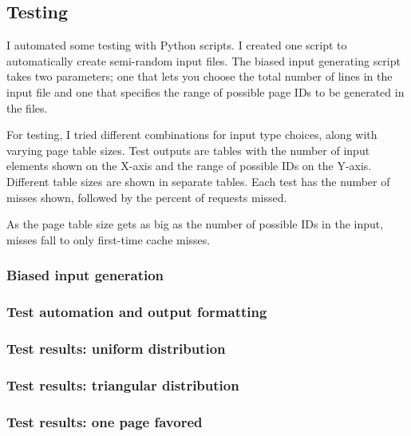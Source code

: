 \documentclass[paper=a4, fontsize=11pt]{scrartcl} %
\numberwithin{equation}{section} %
\numberwithin{figure}{section} %
\numberwithin{table}{section} %
\begin{document}

\subsection{Testing}
I automated some testing with Python scripts. I created one script to automatically create semi-random input files. The biased input generating script takes two parameters; one that lets you choose the total number of lines in the input file and one that specifies the range of possible page IDs to be generated in the files.

For testing, I tried different combinations for input type choices, along with varying page table sizes. Test outputs are tables with the number of input elements shown on the X-axis and the range of possible IDs on the Y-axis. Different table sizes are shown in separate tables. Each test has the number of misses shown, followed by the percent of requests missed.

As the page table size gets as big as the number of possible IDs in the input, misses fall to only first-time cache misses.

\subsubsection{Biased input generation}

\pagebreak

\subsubsection{Test automation and output formatting}

\pagebreak

\subsubsection{Test results: uniform distribution}

\pagebreak

\subsubsection{Test results: triangular distribution}

\pagebreak

\subsubsection{Test results: one page favored}


\end{document}
